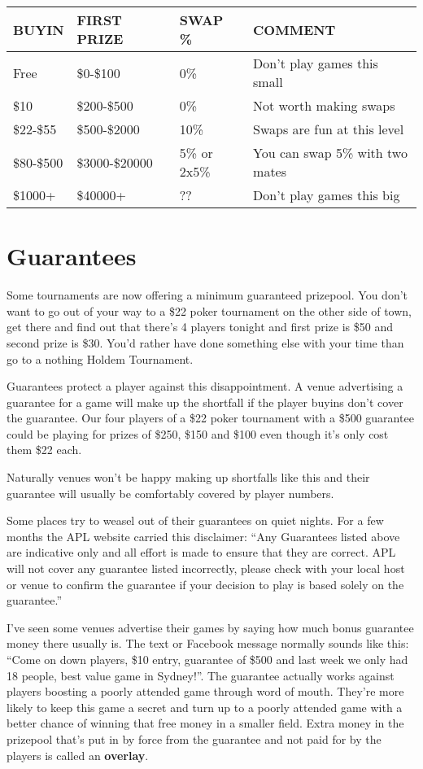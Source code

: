 \begin{tabular}{|l|l|l|l|} \hline
BUYIN      & FIRST PRIZE    & SWAP \% & COMMENT\\ \hline
Free       & \$0-\$100      & 0\%     & Don't play games this small \\ \hline
\$10       & \$200-\$500    & 0\%     & Not worth making swaps \\ \hline
\$22-\$55  & \$500-\$2000   & 10\%    & Swaps are fun at this level \\ \hline
\$80-\$500 & \$3000-\$20000 & 5\% or 2x5\% & You can swap 5\% with two mates \\ \hline
\$1000+    & \$40000+ & ?? & Don't play games this big \\ \hline
\end{tabular}

\section{Guarantees}

Some tournaments are now offering a minimum guaranteed prizepool. You
don't want to go out of your way to a \$22 poker tournament on the
other side of town, get there and find out that there's 4 players tonight
and first prize is \$50 and second prize is \$30. You'd rather have
done something else with your time than go to a nothing Holdem Tournament.

Guarantees protect a player against this disappointment. A venue
advertising a guarantee for a game will make up the shortfall if the
player buyins don't cover the guarantee. Our four players of a \$22
poker tournament with a \$500 guarantee could be playing for prizes
of \$250, \$150 and \$100 even though it's only cost them \$22 each.

Naturally venues won't be happy making up shortfalls like this and
their guarantee will usually be comfortably covered by player numbers.

Some places try to weasel out of their guarantees on quiet nights.
For a few months the APL website carried this disclaimer:
``Any Guarantees listed above are indicative only and all effort
is made to ensure that they are correct. APL will not cover
any guarantee listed incorrectly, please check with your local
host or venue to confirm the guarantee if your decision to
play is based solely on the guarantee.''

I've seen some venues advertise their games by saying how much bonus
guarantee money there usually is. The text or Facebook message
normally sounds like this: ``Come on down players, \$10 entry,
guarantee of \$500 and last week we only had 18 people, best value
game in Sydney!''. The guarantee actually works against players
boosting a poorly attended game through word of
mouth. They're more likely to keep this game a secret and turn up to a
poorly attended game with a better chance of winning that free money
in a smaller field. Extra money in the prizepool that's put in by force
from the guarantee and not paid for by the players is called an
\textbf{overlay}.

